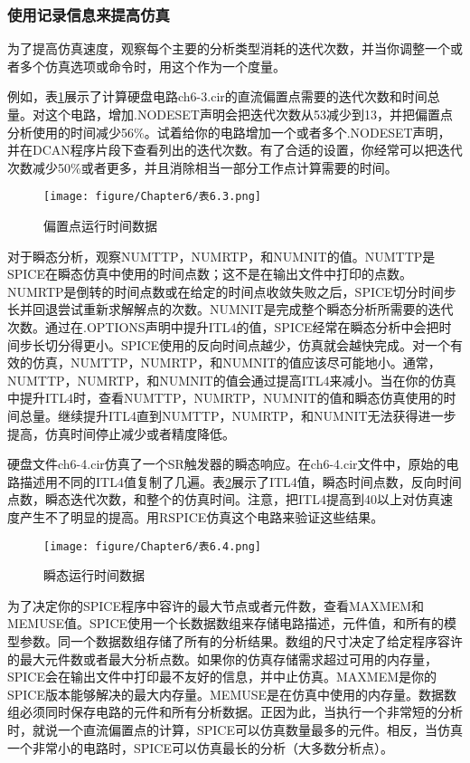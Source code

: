 \subsubsection{使用记录信息来提高仿真}
为了提高仿真速度，观察每个主要的分析类型消耗的迭代次数，并当你调整一个或者多个仿真选项或命令时，用这个作为一个度量。

例如，表\ref{表6.3}展示了计算硬盘电路ch6-3.cir的直流偏置点需要的迭代次数和时间总量。对这个电路，增加.NODESET声明会把迭代次数从53减少到13，并把偏置点分析使用的时间减少56\%。试着给你的电路增加一个或者多个.NODESET声明，并在DCAN程序片段下查看列出的迭代次数。有了合适的设置，你经常可以把迭代次数减少50\%或者更多，并且消除相当一部分工作点计算需要的时间。

\begin{figure}[htbp]
\small
    \centering
    \texttt{[image: figure/Chapter6/表6.3.png]}
    \caption{偏置点运行时间数据}
    \label{表6.3}
\end{figure}

对于瞬态分析，观察NUMTTP，NUMRTP，和NUMNIT的值。NUMTTP是SPICE在瞬态仿真中使用的时间点数；这不是在输出文件中打印的点数。NUMRTP是倒转的时间点数或在给定的时间点收敛失败之后，SPICE切分时间步长并回退尝试重新求解解点的次数。NUMNIT是完成整个瞬态分析所需要的迭代次数。通过在.OPTIONS声明中提升ITL4的值，SPICE经常在瞬态分析中会把时间步长切分得更小。SPICE使用的反向时间点越少，仿真就会越快完成。对一个有效的仿真，NUMTTP，NUMRTP，和NUMNIT的值应该尽可能地小。通常，NUMTTP，NUMRTP，和NUMNIT的值会通过提高ITL4来减小。当在你的仿真中提升ITL4时，查看NUMTTP，NUMRTP，NUMNIT的值和瞬态仿真使用的时间总量。继续提升ITL4直到NUMTTP，NUMRTP，和NUMNIT无法获得进一步提高，仿真时间停止减少或者精度降低。

硬盘文件ch6-4.cir仿真了一个SR触发器的瞬态响应。在ch6-4.cir文件中，原始的电路描述用不同的ITL4值复制了几遍。表\ref{表6.4}展示了ITL4值，瞬态时间点数，反向时间点数，瞬态迭代次数，和整个的仿真时间。注意，把ITL4提高到40以上对仿真速度产生不了明显的提高。用RSPICE仿真这个电路来验证这些结果。

\begin{figure}[htbp]
\small
    \centering
    \texttt{[image: figure/Chapter6/表6.4.png]}
    \caption{瞬态运行时间数据}
    \label{表6.4}
\end{figure}

为了决定你的SPICE程序中容许的最大节点或者元件数，查看MAXMEM和MEMUSE值。SPICE使用一个长数据数组来存储电路描述，元件值，和所有的模型参数。同一个数据数组存储了所有的分析结果。数组的尺寸决定了给定程序容许的最大元件数或者最大分析点数。如果你的仿真存储需求超过可用的内存量，SPICE会在输出文件中打印最不友好的信息，并中止仿真。MAXMEM是你的SPICE版本能够解决的最大内存量。MEMUSE是在仿真中使用的内存量。数据数组必须同时保存电路的元件和所有分析数据。正因为此，当执行一个非常短的分析时，就说一个直流偏置点的计算，SPICE可以仿真数量最多的元件。相反，当仿真一个非常小的电路时，SPICE可以仿真最长的分析（大多数分析点）。

